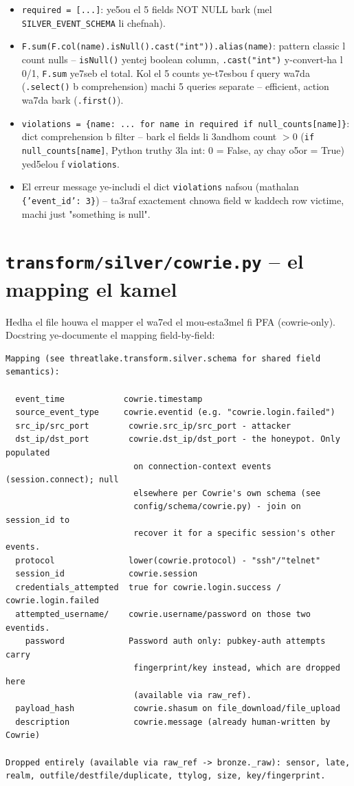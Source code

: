 \documentclass[11pt,a4paper]{report}
\DeclareRobustCommand{\code}[1]{\texttt{#1}}
\DeclareRobustCommand{\file}[1]{\texttt{\color{amber}#1}}
\begin{document}
\begin{itemize}
  \item \code{required = [...]}: ye5ou el 5 fields NOT NULL bark (mel
        \code{SILVER\_EVENT\_SCHEMA} li chefnah).
  \item \code{F.sum(F.col(name).isNull().cast("int")).alias(name)}: pattern
        classic l count nulls -- \code{isNull()} yentej boolean column,
        \code{.cast("int")} y-convert-ha l 0/1, \code{F.sum} ye7seb el
        total. Kol el 5 counts ye-t7esbou f query wa7da (\code{.select()}
        b comprehension) machi 5 queries separate -- efficient, action
        wa7da bark (\code{.first()}).
  \item \code{violations = \{name: ... for name in required if
        null\_counts[name]\}}: dict comprehension b filter -- bark el
        fields li 3andhom count $> 0$ (\code{if null\_counts[name]},
        Python truthy 3la int: 0 = False, ay chay o5or = True) yed5elou
        f \code{violations}.
  \item El erreur message ye-includi el dict \code{violations} nafsou
        (mathalan \code{\{'event\_id': 3\}}) -- ta3raf exactement chnowa
        field w kaddech row victime, machi just "something is null".
\end{itemize}

\section{\file{transform/silver/cowrie.py} -- el mapping el kamel}

Hedha el file houwa el mapper el wa7ed el mou-esta3mel fi PFA (cowrie-only).
Docstring ye-documente el mapping field-by-field:

\begin{lstlisting}[style=pystyle]
Mapping (see threatlake.transform.silver.schema for shared field semantics):

  event_time            cowrie.timestamp
  source_event_type     cowrie.eventid (e.g. "cowrie.login.failed")
  src_ip/src_port        cowrie.src_ip/src_port - attacker
  dst_ip/dst_port        cowrie.dst_ip/dst_port - the honeypot. Only populated
                          on connection-context events (session.connect); null
                          elsewhere per Cowrie's own schema (see
                          config/schema/cowrie.py) - join on session_id to
                          recover it for a specific session's other events.
  protocol               lower(cowrie.protocol) - "ssh"/"telnet"
  session_id             cowrie.session
  credentials_attempted  true for cowrie.login.success / cowrie.login.failed
  attempted_username/    cowrie.username/password on those two eventids.
    password             Password auth only: pubkey-auth attempts carry
                          fingerprint/key instead, which are dropped here
                          (available via raw_ref).
  payload_hash            cowrie.shasum on file_download/file_upload
  description             cowrie.message (already human-written by Cowrie)

Dropped entirely (available via raw_ref -> bronze._raw): sensor, late,
realm, outfile/destfile/duplicate, ttylog, size, key/fingerprint.
\end{lstlisting}
\end{document}
